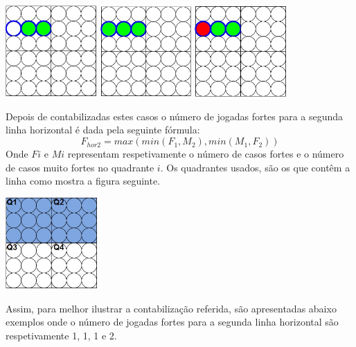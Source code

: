 \begin{table}[H]
\centering
\includegraphics[height=3.5cm]{images/h12_VS.jpg}
\includegraphics[height=3.5cm]{images/h12_VS2.jpg}
\includegraphics[height=3.5cm]{images/h12_S.jpg}
\end{table}

Depois de contabilizadas estes casos o número de jogadas fortes para a segunda linha horizontal é dada pela seguinte fórmula:
\begin{equation}
F_{hor2} = max( min(F_1,M_2) , min(M_1,F_2) )
\end{equation}
Onde $Fi$ e $Mi$ representam respetivamente o número de casos fortes e o número de casos muito fortes no quadrante $i$. Os quadrantes usados, são os que contêm a linha como mostra a figura seguinte.

\begin{table}[H]
\centering
\includegraphics[height=3.5cm]{images/boardsQuadrants.jpg}
\end{table}

Assim, para melhor ilustrar a contabilização referida, são apresentadas abaixo exemplos onde o número de jogadas fortes para a segunda linha horizontal são respetivamente 1, 1, 1 e 2.

